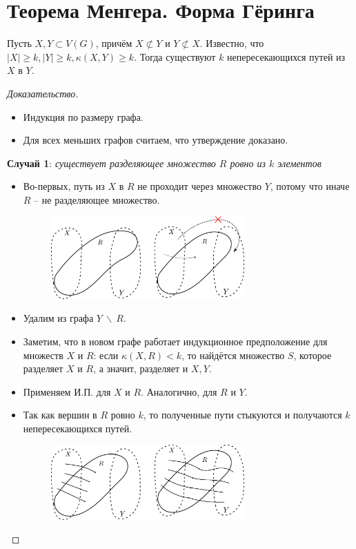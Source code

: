 \section*{Теорема Менгера. Форма Гёринга}


    \begin{theorem}[]
        Пусть $X,Y \subset V(G)$, причём $X \not \subset Y$ и $Y \not \subset X$. Известно, что $|X| \geq k, |Y| \geq k, \kappa(X,Y) \geq k$. Тогда существуют $k$ непересекающихся путей из $X$ в $Y$.
    \end{theorem}
    \begin{proof}[Доказательство] 
        \hfill \begin{itemize}
            \item Индукция по размеру графа.
            \item Для всех меньших графов считаем, что утверждение доказано. 
        \end{itemize}
         
    \textbf{Случай 1}: \textit{существует разделяющее множество $R$ ровно из $k$ элементов}
    \begin{itemize}
        \item Во-первых, путь из $X$ в $R$ не проходит через множество $Y$, потому что иначе $R$ -- не разделяющее множество.
        \begin{figure}[h]
            \centering
            \includegraphics[width=0.7\textwidth]{images/menger1}
        \end{figure}
        \item Удалим из графа $Y \ \backslash \ R$. 
        \item Заметим, что в новом графе работает индукционное предположение для множеств $X$ и $R$: если $\kappa(X, R) < k$, то найдётся множество $S$, которое разделяет $X$ и $R$, а значит, разделяет и $X, Y$.
        \item Применяем И.П. для $X$ и $R$. Аналогично, для $R$ и $Y$.
        \item Так как вершин в $R$ ровно $k$, то полученные пути стыкуются и получаются $k$ непересекающихся путей. 
        \begin{figure}[H]
            \centering
            \includegraphics[width=0.7\textwidth]{images/menger2}
        \end{figure}
    \end{itemize}


\end{proof}
